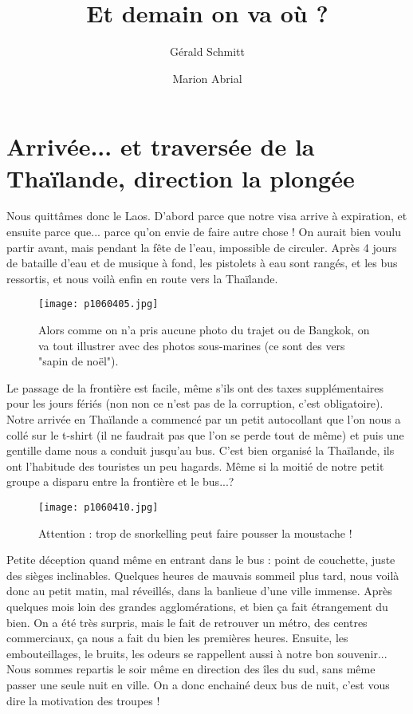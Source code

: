 \documentclass{book}
\title{Et demain on va où ?}
\author{Gérald Schmitt \and Marion Abrial}
\begin{document}
\maketitle




\chapter{Arrivée... et traversée de la Thaïlande, direction la plongée}
Nous quittâmes donc le Laos. D'abord parce que notre visa arrive à expiration, et ensuite parce que... parce qu'on envie de faire autre chose ! On aurait bien voulu partir avant, mais pendant la fête de l'eau, impossible de circuler. Après 4 jours de bataille d'eau et de musique à fond, les pistolets à eau sont rangés, et les bus ressortis, et nous voilà enfin en route vers la Thaïlande.


\begin{figure}[h]
\centering
\texttt{[image: p1060405.jpg]}
\caption*{Alors comme on n'a pris aucune photo du trajet ou de Bangkok, on va tout illustrer avec des photos sous-marines (ce sont des vers "sapin de noël").}
\end{figure}

Le passage de la frontière est facile, même s'ils ont des taxes supplémentaires pour les jours fériés (non non ce n'est pas de la corruption, c'est obligatoire).
Notre arrivée en Thaïlande a commencé par un petit autocollant que l'on nous a collé sur le t-shirt (il ne faudrait pas que l'on se perde tout de même) et puis une gentille dame nous a conduit jusqu'au bus. C'est bien organisé la Thaïlande, ils ont l'habitude des touristes un peu hagards. Même si la moitié de notre petit groupe a disparu entre la frontière et le bus...?


\begin{figure}[h]
\centering
\texttt{[image: p1060410.jpg]}
\caption*{Attention : trop de snorkelling peut faire pousser la moustache !}
\end{figure}

Petite déception quand même en entrant dans le bus : point de couchette, juste des sièges inclinables. Quelques heures de mauvais sommeil plus tard, nous voilà donc au petit matin, mal réveillés, dans la banlieue d'une ville immense. Après quelques mois loin des grandes agglomérations, et bien ça fait étrangement du bien. On a été très surpris, mais le fait de retrouver un métro, des centres commerciaux, ça nous a fait du bien les premières heures. Ensuite, les embouteillages, le bruits, les odeurs se rappellent aussi à notre bon souvenir... Nous sommes repartis le soir même en direction des îles du sud, sans même passer une seule nuit en ville. On a donc enchainé deux bus de nuit, c'est vous dire la motivation des troupes !
\end{document}

